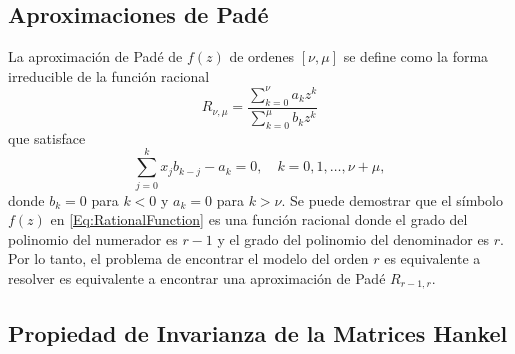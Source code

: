 	\subsection{Aproximaciones de Padé}
		La aproximación de Padé de $f(z)$ de ordenes $[\nu,\mu]$ se define como la forma irreducible de la función racional
	\begin{equation}
		R_{\nu,\mu} = \frac{\sum_{k=0}^{\nu}a_kz^k }{\sum_{k=0}^{\mu}b_kz^k}
		\label{Eq:PadeApprox}
	\end{equation} que satisface
	\begin{equation}
		\sum_{j=0}^{k}x_jb_{k-j}-a_k = 0, \quad k = 0,1,\ldots, \nu+\mu,
		\label{Eq:PadeApprox1}
	\end{equation}
	donde $b_k = 0$ para $k<0$ y $a_k = 0$ para $k>\nu$. Se puede demostrar que el símbolo $f(z)$ en \eqref{Eq:RationalFunction} es una función racional donde el grado del polinomio del numerador es $r-1$ y el grado del polinomio del denominador es $r$. Por lo tanto, el problema de encontrar el modelo del orden $r$  es equivalente a resolver es equivalente a encontrar una aproximación de Padé $R_{r-1,r}$.

\subsection{Propiedad de Invarianza de la Matrices Hankel}

